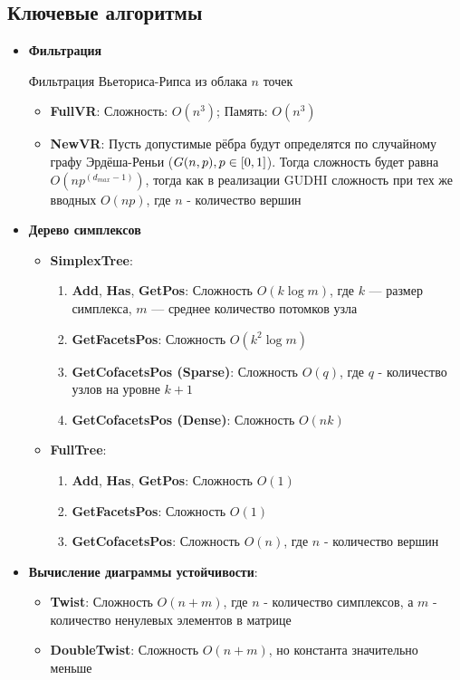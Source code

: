 \documentclass{article}
\begin{document}
\subsection{Ключевые алгоритмы}
\begin{itemize}
\item \textbf{Фильтрация}

Фильтрация Вьеториса-Рипса из облака $n$ точек
\begin{itemize}
    \item \textbf{FullVR}: Сложность: $O(n^3)$; Память: $O(n^3)$
    \item \textbf{NewVR}: Пусть допустимые рёбра будут определятся по случайному графу Эрдёша-Реньи ($G(n, p),\q p \in [0, 1]$). Тогда сложность будет равна $O(np^{(d_{max} - 1)})$, тогда как в реализации GUDHI сложность при тех же вводных $O(np)$, где $n$ - количество вершин
\end{itemize}

\item \textbf{Дерево симплексов}
\begin{itemize}
  \item \textbf{SimplexTree}:
  \begin{enumerate}
    \item \textbf{Add}, \textbf{Has}, \textbf{GetPos}: Сложность $O(k\log m)$, где $k$ — размер симплекса, $m$ — среднее количество потомков узла
    \item \textbf{GetFacetsPos}: Сложность $O(k^2\log m)$
    \item \textbf{GetCofacetsPos (Sparse)}: Сложность $O(q)$, где $q$ - количество узлов на уровне $k + 1$
    \item \textbf{GetCofacetsPos (Dense)}: Сложность $O(nk)$
  \end{enumerate}
  \item \textbf{FullTree}:
  \begin{enumerate}
    \item \textbf{Add}, \textbf{Has}, \textbf{GetPos}: Сложность $O(1)$
    \item \textbf{GetFacetsPos}: Сложность $O(1)$
    \item \textbf{GetCofacetsPos}: Сложность $O(n)$, где $n$ - количество вершин
  \end{enumerate}
\end{itemize}

\item \textbf{Вычисление диаграммы устойчивости}:
\begin{itemize}
  \item \textbf{Twist}: Сложность $O(n + m)$, где $n$ - количество симплексов, а $m$ - количество ненулевых элементов в матрице
  \item \textbf{DoubleTwist}:  Сложность $O(n + m)$, но константа значительно меньше
\end{itemize}


\end{itemize}
\end{document}
